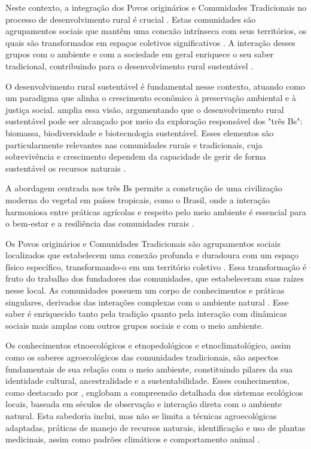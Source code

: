 Neste contexto, a integração dos Povos originários e Comunidades Tradicionais no processo de desenvolvimento rural é crucial \cite{Abramovay2020}. Estas comunidades são agrupamentos sociais que mantêm uma conexão intrínseca com seus territórios, os quais são transformados em espaços coletivos significativos \cite{Kovaleva2021}. A interação desses grupos com o ambiente e com a sociedade em geral enriquece o seu saber tradicional, contribuindo para o desenvolvimento rural sustentável \cite{Montanari2020}.

O desenvolvimento rural sustentável é fundamental nesse contexto, atuando como um paradigma que alinha o crescimento econômico à preservação ambiental e à justiça social.  amplia essa visão, argumentando que o desenvolvimento rural sustentável pode ser alcançado por meio da exploração responsável dos "três Bs": biomassa, biodiversidade e biotecnologia sustentável. Esses elementos são particularmente relevantes nas comunidades rurais e tradicionais, cuja sobrevivência e crescimento dependem da capacidade de gerir de forma sustentável os recursos naturais \cite{Tagliapietra2021}.

A abordagem centrada nos três Bs permite a construção de uma civilização moderna do vegetal em países tropicais, como o Brasil, onde a interação harmoniosa entre práticas agrícolas e respeito pelo meio ambiente é essencial para o bem-estar e a resiliência das comunidades rurais \cite{Sachs1993}.

Os Povos originários e Comunidades Tradicionais são agrupamentos sociais localizados que estabelecem uma conexão profunda e duradoura com um espaço físico específico, transformando-o em um território coletivo \cite{Grant2020}. Essa transformação é fruto do trabalho dos fundadores das comunidades, que estabeleceram suas raízes nesse local. As comunidades possuem um corpo de conhecimentos e práticas singulares, derivados das interações complexas com o ambiente natural \cite{Clayton2019}. Esse saber é enriquecido tanto pela tradição quanto pela interação com dinâmicas sociais mais amplas com outros grupos sociais e com o meio ambiente.

Os conhecimentos etnoecológicos e etnopedológicos e etnoclimatológico, assim como os saberes agroecológicos das comunidades tradicionais, são aspectos fundamentais de sua relação com o meio ambiente, constituindo pilares da sua identidade cultural, ancestralidade e a sustentabilidade. Esses conhecimentos, como destacado por , englobam a compreensão detalhada dos sistemas ecológicos locais, baseada em séculos de observação e interação direta com o ambiente natural. Esta sabedoria inclui, mas não se limita a técnicas agroecológicas adaptadas, práticas de manejo de recursos naturais, identificação e uso de plantas medicinais, assim como padrões climáticos e comportamento animal \cite{Ahad2023}.

